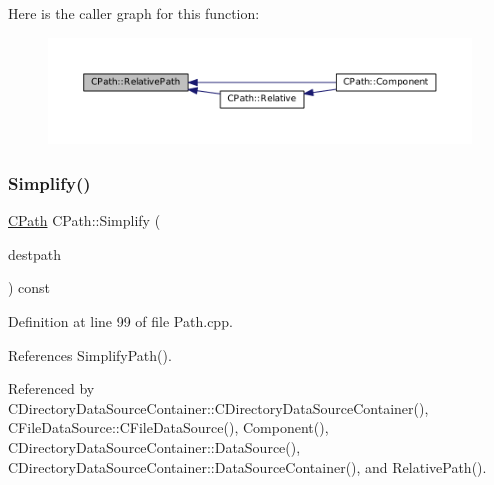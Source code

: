 Here is the caller graph for this function\+:\nopagebreak
\begin{figure}[H]
\begin{center}
\leavevmode
\includegraphics[width=350pt]{classCPath_a76f73670ecc0a434c2f8a1ea0f1a040e_icgraph}
\end{center}
\end{figure}
\hypertarget{classCPath_aa52dcb50c943a8abc8883db5ec43a45e}{}\label{classCPath_aa52dcb50c943a8abc8883db5ec43a45e} 
\subsubsection{\texorpdfstring{Simplify()}{Simplify()}}
{\footnotesize\ttfamily \hyperlink{classCPath}{C\+Path} C\+Path\+::\+Simplify (\begin{DoxyParamCaption}\item[{const \hyperlink{classCPath}{C\+Path} \&}]{destpath }\end{DoxyParamCaption}) const}



Definition at line 99 of file Path.\+cpp.



References Simplify\+Path().



Referenced by C\+Directory\+Data\+Source\+Container\+::\+C\+Directory\+Data\+Source\+Container(), C\+File\+Data\+Source\+::\+C\+File\+Data\+Source(), Component(), C\+Directory\+Data\+Source\+Container\+::\+Data\+Source(), C\+Directory\+Data\+Source\+Container\+::\+Data\+Source\+Container(), and Relative\+Path().


